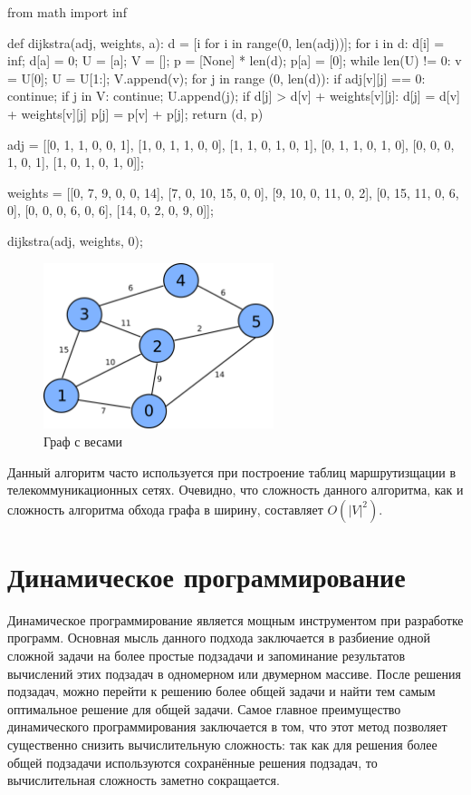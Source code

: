 \begin{python}
from math import inf

def dijkstra(adj, weights, a):
	d = [i for i in range(0, len(adj))];
	for i in d:
		d[i] = inf;
	d[a] = 0;
	U = [a];
	V = [];
	p = [None] * len(d);
	p[a] = [0];
	while len(U) != 0:
		v = U[0];
		U = U[1:];
		V.append(v);
		for j in range (0, len(d)):
			if adj[v][j] == 0:
				continue;
			if j in V:
				continue;
			U.append(j);
			if d[j] > d[v] + weights[v][j]:
				d[j] = d[v] + weights[v][j]
				p[j] = p[v] + p[j];
	return (d, p)

adj = [[0, 1, 1, 0, 0, 1],
		[1, 0, 1, 1, 0, 0],
		[1, 1, 0, 1, 0, 1],
		[0, 1, 1, 0, 1, 0],
		[0, 0, 0, 1, 0, 1],
		[1, 0, 1, 0, 1, 0]];

weights = [[0, 7, 9, 0, 0, 14],
		[7, 0, 10, 15, 0, 0],
		[9, 10, 0, 11, 0, 2],
		[0, 15, 11, 0, 6, 0],
		[0, 0, 0, 6, 0, 6],
		[14, 0, 2, 0, 9, 0]];

dijkstra(adj, weights, 0);

\end{python}

\begin{figure}
\centering
\includegraphics[width=0.6\textwidth]{graphics/dijkstra.png}
\caption{Граф с весами}
\label{fig:dijkstra}
\end{figure}

Данный алгоритм часто используется при построение таблиц маршрутизщации в 
телекоммуникационных сетях. Очевидно, что сложность данного алгоритма,
как и сложность алгоритма обхода графа в ширину, составляет $O(|V|^2)$.

\section{Динамическое программирование}

Динамическое программирование является мощным инструментом 
при разработке программ. Основная мысль данного подхода заключается 
в разбиение одной сложной задачи на более простые подзадачи и запоминание 
результатов вычислений этих подзадач в одномерном или двумерном массиве. 
После решения подзадач, можно перейти к решению более общей задачи и найти тем 
самым оптимальное решение для общей задачи. Самое главное преимущество динамического
программирования заключается в том, что этот метод позволяет существенно снизить 
вычислительную сложность: так как для решения более общей подзадачи используются
сохранённые решения подзадач, то вычислительная сложность заметно сокращается. 

